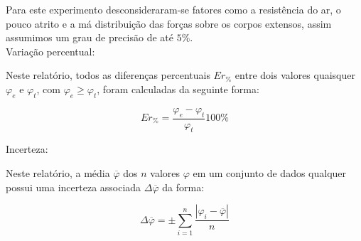 \documentclass[
   12pt,                         %
   openright,                    %
   oneside,                      %
   a4paper,                      %
   sumario = tradicional,        %
   chapter=TITLE,                %
   section=TITLE,                %
   subsection=TITLE,             %
   subsubsection=TITLE,          %
   english,                      %
   french,                       %
   spanish,                      %
   brazil,                       %
   xcolor=table                  %
]{abntex2}
\begin{document}
      Para este experimento desconsideraram-se fatores como a resistência do ar, o pouco atrito e a má distribuição das forças 
      sobre os corpos extensos, assim assumimos um grau de precisão de até $5\%$. \\

      \noindent Variação percentual:

      Neste relatório, todos as diferenças percentuais $Er_\%$ entre dois valores quaisquer $\varphi_e$ e $\varphi_t$, com 
      $\varphi_e\geq\varphi_t$, foram 
      calculadas da seguinte forma:

      \begin{equation} \label{eq:errper}
         Er_\% = \frac{\varphi_e - \varphi_t}{\varphi_t}100\%
      \end{equation}

      \noindent Incerteza:

      Neste relatório, a média $\overline{\varphi}$ dos $n$ valores $\varphi$ em um conjunto de dados qualquer possui uma 
      incerteza associada $\Delta \overline{\varphi}$ da forma:

      \begin{equation}\label{eq:incet}
         \Delta \overline{\varphi} = ± \sum_{i=1}^{n} \frac{| \varphi_i - \overline{\varphi}|}{n}
      \end{equation}

   
\end{document}
